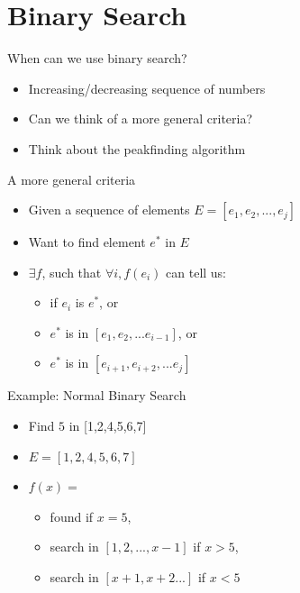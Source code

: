 \documentclass[presentation]{beamer}
\begin{document}
\section{Binary Search}
\label{sec:org6e99100}
\begin{frame}[<+->][label={sec:org9c6066c}]{When can we use binary search?}
\begin{itemize}
\item Increasing/decreasing sequence of numbers
\item Can we think of a more general criteria?
\item Think about the peakfinding algorithm
\end{itemize}
\end{frame}
\begin{frame}[label={sec:org7f1b26b}]{A more general criteria}
\begin{itemize}
\item Given a sequence of elements \(E = [e_{1}, e_{2}, ..., e_{j}]\)
\item Want to find element \(e^{*}\) in \(E\)
\item \(\exists f\), such that \(\forall i, f(e_{i})\) can tell us:
\begin{itemize}
\item if \(e_{i}\) is \(e^{*}\), or
\item \(e^{*}\) is in \([e_{1}, e_{2}, ... e_{i - 1}]\), or
\item \(e^{*}\) is in \([e_{i+1}, e_{i+2}, ... e_{j}]\)
\end{itemize}
\end{itemize}
\end{frame}
\begin{frame}[label={sec:org89b94a4}]{Example: Normal Binary Search}
\begin{itemize}
\item Find \(5\) in [1,2,4,5,6,7]
\item \(E = [1,2,4,5,6,7]\)
\item \(f(x) =\)
\begin{itemize}
\item found if \(x = 5\),
\item search in \([1,2,...,x - 1]\) if \(x > 5\),
\item search in \([x + 1, x+2...]\) if \(x < 5\)
\end{itemize}
\end{itemize}
\end{frame}
\end{document}
